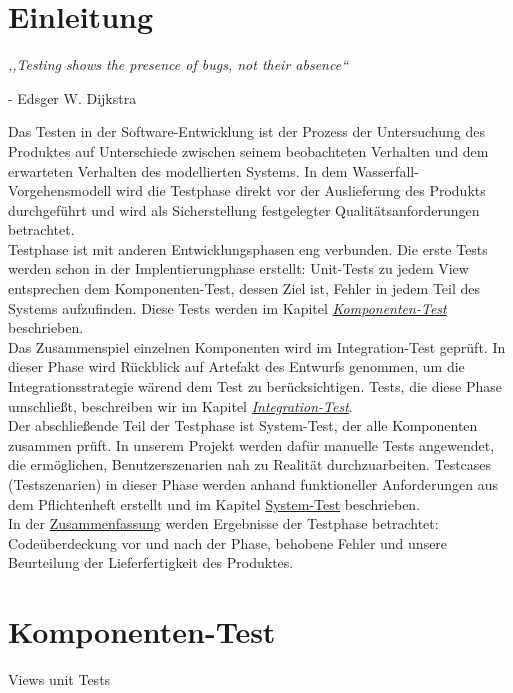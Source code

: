 \documentclass[parskip=full,11pt]{scrartcl}
\begin{document}
 \section{Einleitung}
\begin{center}
\textit{,,Testing shows the presence of bugs, not their absence``}
\end{center}
\begin{flushright}
- Edsger W. Dijkstra\\
\end{flushright}
Das Testen in der Software-Entwicklung ist der Prozess der Untersuchung des Produktes auf Unterschiede zwischen seinem beobachteten Verhalten und dem erwarteten Verhalten des modellierten Systems.
In dem Wasserfall-Vorgehensmodell wird die Testphase direkt vor der Auslieferung des Produkts durchgeführt und wird als Sicherstellung festgelegter Qualitätsanforderungen betrachtet.\\
Testphase ist mit anderen Entwicklungsphasen eng verbunden. Die erste Tests werden schon in der Implentierungphase erstellt: Unit-Tests zu jedem View entsprechen dem Komponenten-Test, dessen Ziel ist, Fehler in jedem Teil des Systems aufzufinden. Diese Tests werden im Kapitel \hyperref[komponententest]{\textit{Komponenten-Test}} beschrieben.\\
Das Zusammenspiel einzelnen Komponenten wird im Integration-Test gepr\"uft. In dieser Phase wird R\"uckblick auf Artefakt des Entwurfs genommen, um die Integrationsstrategie w\"arend dem Test zu ber\"ucksichtigen. Tests, die diese Phase umschließt, beschreiben wir im Kapitel \hyperref[integrationtest]{\textit{Integration-Test}}.\\
Der abschließende Teil der Testphase ist System-Test, der alle Komponenten zusammen pr\"uft. In unserem Projekt werden daf\"ur manuelle Tests angewendet, die erm\"oglichen, Benutzerszenarien nah zu Realit\"at durchzuarbeiten. Testcases (Testszenarien) in dieser Phase werden anhand funktioneller Anforderungen aus dem Pflichtenheft erstellt und im Kapitel \hyperref[systemtest]{System-Test} beschrieben.\\
In der \hyperref[zusammenfassung]{Zusammenfassung} werden Ergebnisse der Testphase betrachtet: Code\"uberdeckung vor und nach der Phase, behobene Fehler und unsere Beurteilung der Lieferfertigkeit des Produktes.
 \newpage
\section{Komponenten-Test} \label{komponententest}
Views unit Tests
\end{document}

